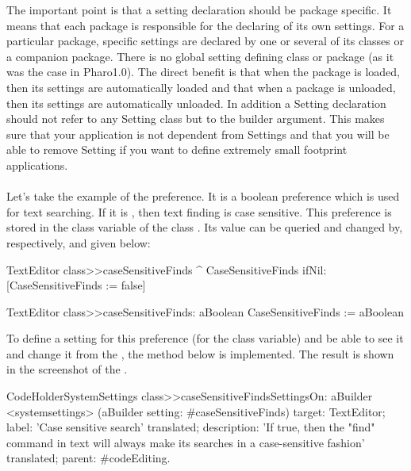 \documentclass[a4paper,10pt,twoside]{book}
\begin{document}
The important point is that a setting declaration should be package specific. It means that each package is responsible for the declaring of its own settings. For a particular package, specific settings are declared by one or several of its classes or a companion package. There is no global setting defining class or package (as it was the case in Pharo1.0). The direct benefit is that when the package is loaded, then its settings are automatically loaded and that when a package is unloaded, then its settings are automatically unloaded. In addition a Setting declaration should not refer to any Setting class but to the builder argument. This makes sure that your application is not dependent from Settings and that you will be able to remove Setting if you want to define extremely small footprint applications. 
\paragraph{}
Let's take the example of the  preference. It is a boolean preference which is used for text searching. If it is , then text finding is case sensitive. This preference is stored in the  class variable of the class . Its value can be queried and changed by, respectively,  and  given below:
\begin{code}{}
TextEditor class>>caseSensitiveFinds
	^ CaseSensitiveFinds ifNil: [CaseSensitiveFinds := false]

TextEditor class>>caseSensitiveFinds: aBoolean
	CaseSensitiveFinds := aBoolean
\end{code}

To define a setting for this preference (\ie for the  class variable) and be able to see it and change it from the \setbrowser, the method below is implemented. The result is shown in the screenshot of the . 

\begin{code}{}
CodeHolderSystemSettings class>>caseSensitiveFindsSettingsOn: aBuilder
	<systemsettings>
	(aBuilder setting: #caseSensitiveFinds) 
		target: TextEditor;
		label: 'Case sensitive search' translated;
		description: 'If true, then the "find" command in text will always make its searches in a case-sensitive fashion' translated;
		parent: #codeEditing.
\end{code}
\end{document}
